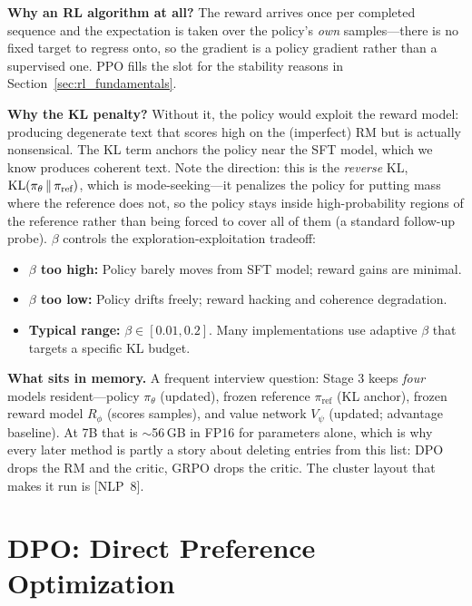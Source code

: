 \textbf{Why an RL algorithm at all?} The reward arrives once per completed sequence and the expectation is taken over the policy's \textit{own} samples---there is no fixed target to regress onto, so the gradient is a policy gradient rather than a supervised one. PPO fills the slot for the stability reasons in Section~\ref{sec:rl_fundamentals}.

\textbf{Why the KL penalty?} Without it, the policy would exploit the reward model: producing degenerate text that scores high on the (imperfect) RM but is actually nonsensical. The KL term anchors the policy near the SFT model, which we know produces coherent text. Note the direction: this is the \textit{reverse} KL, $\operatorname{KL}(\pi_\theta \,\|\, \pi_{\text{ref}})$, which is mode-seeking---it penalizes the policy for putting mass where the reference does not, so the policy stays inside high-probability regions of the reference rather than being forced to cover all of them (a standard follow-up probe). $\beta$ controls the exploration-exploitation tradeoff:
\begin{itemize}
    \item \textbf{$\beta$ too high:} Policy barely moves from SFT model; reward gains are minimal.
    \item \textbf{$\beta$ too low:} Policy drifts freely; reward hacking and coherence degradation.
    \item \textbf{Typical range:} $\beta \in [0.01, 0.2]$. Many implementations use adaptive $\beta$ that targets a specific KL budget.
\end{itemize}

\textbf{What sits in memory.} A frequent interview question: Stage 3 keeps \textit{four} models resident---policy $\pi_\theta$ (updated), frozen reference $\pi_{\text{ref}}$ (KL anchor), frozen reward model $R_\phi$ (scores samples), and value network $V_\psi$ (updated; advantage baseline). At 7B that is $\sim$56\,GB in FP16 for parameters alone, which is why every later method is partly a story about deleting entries from this list: DPO drops the RM and the critic, GRPO drops the critic. The cluster layout that makes it run is [NLP~8].

\section{DPO: Direct Preference Optimization}
\label{sec:dpo}

